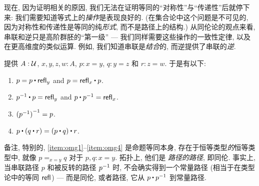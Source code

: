 现在, 因为证明相关的原因, 我们无法在证明等同的``对称性''与``传递性''后就停下来: 我们需要知道等式上的\emph{操作}是表现良好的.
(在集合论中这个问题是不可见的, 因为对称性和传递性是等同的纯\emph{形式}, 而不是路径上的结构.)
从同伦论的观点来看, 串联和逆只是高阶群胚的``第一级'' --- 我们同样需要这些操作的一致性定律, 以及在更高维度的类似运算.
例如, 我们知道串联是\emph{结合}的, 而逆提供了串联的\emph{逆}.

\begin{lem}
    \label{thm:omg}%
    提供 $A:\mathcal{U}$, $x,y,z,w:A$, $p:x= y$, $q:y = z$ 和 $r:z=w$.
    于是有以下:
    \begin{enumerate}
        \item $p= p\ct \refl{y}$ and $p = \refl{x} \ct p$.\label{item:omg1}
        \item $\opp{p}\ct p= \refl{y}$ and $p\ct \opp{p}= \refl{x}$.\label{item:omg2}
        \item $\mathord{{(\mathord{{p}^{-1}})}^{-1}}= p$.\label{item:omg3}
        \item $p\ct (q\ct r)= (p\ct q)\ct r$.\label{item:omg4}
    \end{enumerate}
\end{lem}

备注, 特别的, \ref{item:omg1}--\ref{item:omg4} 是命题等同本身, 存在于恒等类型\emph{的}恒等类型中, 就像 $p=_{x=y}q$ 对于 $p,q:x=y$.
拓扑上, 他们是 \emph{路径的路径}, 即同伦.
事实上, 当串联路径 $p$ 和被反转的路径 $\mathord{{p}^{-1}}$ 时, 不会确实得到一个常量路径 (相当于在类型论中的等同 $\mathsf{refl}_{}$) --- 而是同伦, 或者路径, 它从 $p\ct\opp p$ 到常量路径.

